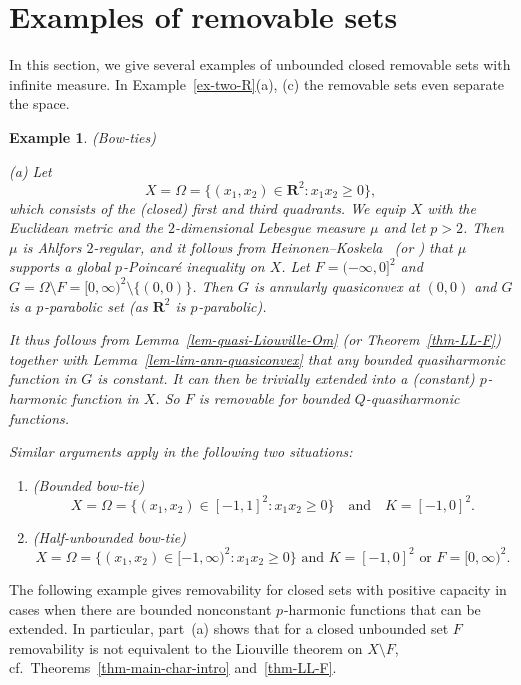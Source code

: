 \documentclass[a4paper,twoside]{article}
\theoremstyle{propositional}
\theoremstyle{descriptive}
\newtheorem{example}[thm]{Example}
\theoremstyle{remarkstyle}
\newcommand{\setm}{\setminus}
\newcommand{\Om}{\Omega}
\newcommand{\p}{{$p\mspace{1mu}$}}
\newcommand{\R}{\mathbf{R}}
\numberwithin{equation}{section}
\begin{document}
\section{Examples of removable sets}
\label{sect-examples}



In this section, we give several examples
of unbounded closed removable sets with infinite measure.
In 
Example~\ref{ex-two-R}(a), (c)
the removable sets even separate the space.


\begin{example}  \label{ex-bow-ties}
(Bow-ties) 

(a) 
Let 
\[
   X=\Om=\{(x_1,x_2) \in \R^2 : x_1x_2 \ge 0\},
\]
which consists of the (closed) first and third quadrants.
We equip $X$ with the Euclidean metric and
the $2$-dimensional Lebesgue measure $\mu$ and let $p>2$.
Then $\mu$ is Ahlfors $2$-regular, and it follows
from Heinonen--Koskela~\cite[Theorem~6.15]{HeKo98}
(or \cite[Example~A.23]{BBbook})
that $\mu$ supports a global \p-Poincar\'e inequality on $X$.
Let $F=(-\infty,0]^2$ and $G=\Om \setm F = [0,\infty)^2 \setm\{(0,0)\}$.
Then $G$ is annularly quasiconvex at $(0,0)$ and $G$ is a \p-parabolic
set (as $\R^2$ is \p-parabolic).

It thus follows from  Lemma~\ref{lem-quasi-Liouville-Om}
(or Theorem~\ref{thm-LL-F})
together with Lemma~\ref{lem-lim-ann-quasiconvex} 
that any bounded
quasiharmonic function in $G$ is constant.
It can then be trivially extended into a (constant) \p-harmonic function 
in $X$.
So $F$ is removable for bounded $Q$-quasiharmonic functions.

Similar arguments apply in the following two situations:
\begin{enumerate}
\item (Bounded bow-tie) 
\[
   X=\Om=\{(x_1,x_2) \in [-1,1]^2 : x_1x_2 \ge 0\}
\quad \text{and} \quad K=[-1,0]^2.
\]
\item (Half-unbounded bow-tie) 
\[
X=\Om=\{(x_1,x_2) \in [-1,\infty)^2 : x_1x_2 \ge 0\}
 \text{ and } 
   K=[-1,0]^2 \text{ or }F= [0,\infty)^2.
\]
\end{enumerate}
\end{example}

The following example gives removability for closed sets
with positive capacity in cases when
there are bounded nonconstant \p-harmonic
functions that can be extended.
In particular, part~(a) shows that 
for a closed unbounded set $F$ removability
is not equivalent to the Liouville theorem on $X \setm F$,
cf.\ Theorems~\ref{thm-main-char-intro} and~\ref{thm-LL-F}.
\end{document}
